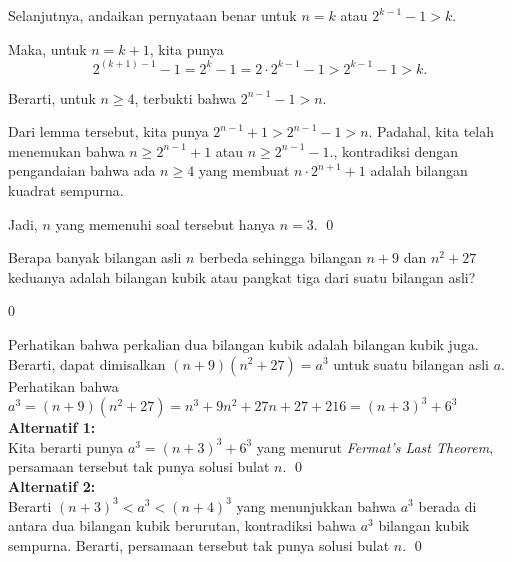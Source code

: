 \documentclass[12pt]{scrartcl}
\begin{document}
\begin{soalbaru}
\begin{solusi}
\begin{lemmarev}
\begin{buktilemma}
			Selanjutnya, andaikan pernyataan benar untuk $n=k$ atau $2^{k-1}-1 > k$.
			
			Maka, untuk $n=k+1$, kita punya 
			$$2^{(k+1)-1}-1=2^k-1=2 \cdot 2^{k-1} -1 > 2^{k-1}-1 > k.$$
			
			Berarti, untuk $n \ge 4$, terbukti bahwa $2^{n-1}-1 > n$.
			\end{buktilemma}
			\end{lemmarev}
			
			Dari lemma tersebut, kita punya $2^{n-1}+1 > 2^{n-1}-1 > n$. Padahal, kita telah menemukan bahwa $n \ge 2^{n-1}+1$ atau $n \ge 2^{n-1}-1$., kontradiksi dengan pengandaian bahwa ada $n \ge 4$ yang membuat $n \cdot 2^{n+1} +1$ adalah bilangan kuadrat sempurna.
			
			Jadi, $n$ yang memenuhi soal tersebut hanya $n=3$. \qed
		\end{solusi}
	\end{soalbaru}
\vspace{20pt}
	\begin{soalbaru}
		Berapa banyak bilangan asli $n$ berbeda sehingga bilangan $n+9$ dan $n^2+27$ keduanya adalah bilangan kubik atau pangkat tiga dari suatu bilangan asli?
		
		\begin{jawaban}
				0
				\end{jawaban}
				\begin{solusi}
				Perhatikan bahwa perkalian dua bilangan kubik adalah bilangan kubik juga. Berarti, dapat dimisalkan $(n+9)(n^2+27)=a^3$ untuk suatu bilangan asli $a$. Perhatikan bahwa $a^3=(n+9)(n^2+27)=n^3+9n^2+27n+27+216=(n+3)^3+6^3$\\
                \textbf{Alternatif 1:}\\
                Kita berarti punya $a^3=(n+3)^3+6^3$ yang menurut \textit{Fermat's Last Theorem}, persamaan tersebut tak punya solusi bulat $n$. \qed\\
                \textbf{Alternatif 2:}\\
                Berarti $(n+3)^3 < a^3 < (n+4)^3$ yang menunjukkan bahwa $a^3$ berada di antara dua bilangan kubik berurutan, kontradiksi bahwa $a^3$ bilangan kubik sempurna. Berarti, persamaan tersebut tak punya solusi bulat $n$. 
                \qed
				\end{solusi}
	\end{soalbaru}
\end{document}
